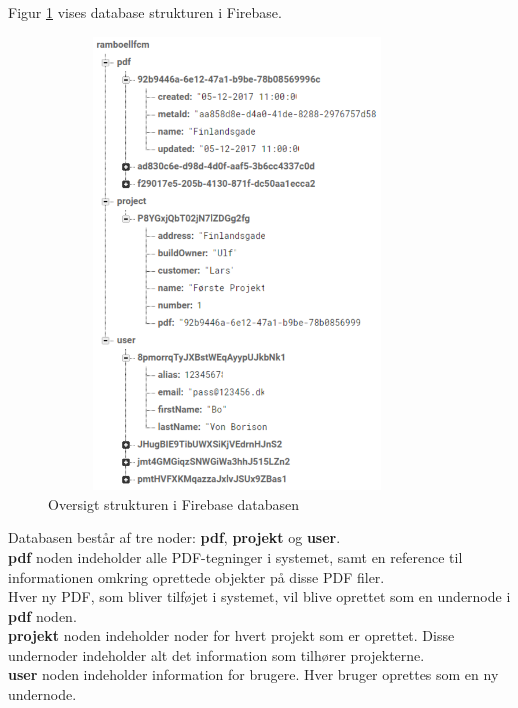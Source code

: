 Figur \ref{fig:FirebaseDB} vises database strukturen i Firebase. 
\begin{figure}[H] %
	\centering
	\includegraphics[height=12cm, width=10cm]{Design/Firebase/FirebaseDB}
	\caption{Oversigt strukturen i Firebase databasen}
	\label{fig:FirebaseDB}
\end{figure}
Databasen består af tre noder: \textbf{pdf}, \textbf{projekt} og \textbf{user}. \\
\textbf{pdf} noden indeholder alle PDF-tegninger i systemet, samt en reference til informationen omkring oprettede objekter på disse PDF filer. \\
Hver ny PDF, som bliver tilføjet i systemet, vil blive oprettet som en undernode i \textbf{pdf} noden. \\
\textbf{projekt} noden indeholder noder for hvert projekt som er oprettet. Disse undernoder indeholder alt det information som tilhører projekterne. \\
\textbf{user} noden indeholder information for brugere. Hver bruger oprettes som en ny undernode.

\clearpage